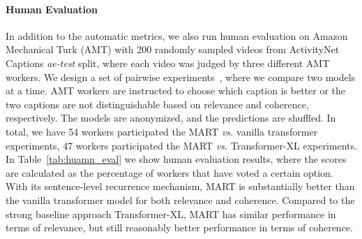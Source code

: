 \documentclass[11pt,a4paper]{article}
\begin{document}
\begin{table}[!t]
\centering
\small
{}
\caption{Human evaluation on ActivityNet Captions \textit{ae-test} set w.r.t. relevance and coherence. \textit{Top}: MART \textit{vs.} vanilla transformer (VTransformer). \textit{Bottom}: MART \textit{vs.} Transformer-XL.}
\label{tab:huamn_eval}
\end{table}




\paragraph{Human Evaluation}
In addition to the automatic metrics, we also run human evaluation on Amazon Mechanical Turk (AMT) with 200 randomly sampled videos from ActivityNet Captions \textit{ae-test} split, where each video was judged by three different AMT workers.
We design a set of pairwise experiments~\cite{pasunuru2017reinforced, park2019adversarial}, where we compare two models at a time. 
AMT workers are instructed to choose which caption is better or the two captions are not distinguishable based on relevance and coherence, respectively. 
The models are anonymized, and the predictions are shuffled. In total, we have 54 workers participated the MART \textit{vs.} vanilla transformer experiments, 47 workers participated the MART \textit{vs.} Transformer-XL experiments.
In Table~\ref{tab:huamn_eval} we show human evaluation results, where the scores are calculated as the percentage of workers that have voted a certain option. 
With its sentence-level recurrence mechanism, MART is substantially better than the vanilla transformer model for both relevance and coherence.
Compared to the strong baseline approach Transformer-XL, MART has similar performance in terms of relevance, but still reasonably better performance in terms of coherence. 
\end{document}
